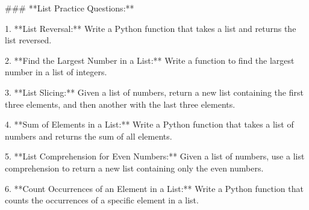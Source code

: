 ### **List Practice Questions:**

1. **List Reversal:** Write a Python function that takes a list and returns the list reversed.
   
2. **Find the Largest Number in a List:** Write a function to find the largest number in a list of integers.

3. **List Slicing:** Given a list of numbers, return a new list containing the first three elements, and then another with the last three elements.

4. **Sum of Elements in a List:** Write a Python function that takes a list of numbers and returns the sum of all elements.

5. **List Comprehension for Even Numbers:** Given a list of numbers, use a list comprehension to return a new list containing only the even numbers.

6. **Count Occurrences of an Element in a List:** Write a Python function that counts the occurrences of a specific element in a list.
